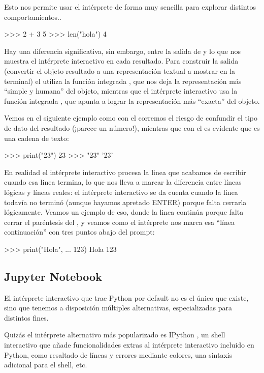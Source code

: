 Esto nos permite usar el intérprete de forma muy sencilla para explorar distintos comportamientos..

\begin{py}
>>> 2 + 3
5
>>> len("hola")
4
\end{py}

Hay una diferencia significativa, sin embargo, entre la salida de  y lo que nos muestra el intérprete interactivo en cada resultado. Para construir la salida (convertir el objeto resultado a una representación textual a mostrar en la terminal) el  utiliza la función integrada , que nos deja la representación más ``simple y humana'' del objeto, mientras que el intérprete interactivo usa la función integrada , que apunta a lograr la representación más ``exacta'' del objeto.

Vemos en el siguiente ejemplo como con el  corremos el riesgo de confundir el tipo de dato del resultado (¡parece un número!), mientras que con el  es evidente que es una cadena de texto:

\begin{py}
>>> print("23")
23
>>> "23"
'23'
\end{py}

En realidad el intérprete interactivo procesa la linea que acabamos de escribir cuando esa linea termina, lo que nos lleva a marcar la diferencia entre líneas lógicas y líneas reales: el intérprete interactivo se da cuenta cuando la linea todavía no terminó (aunque hayamos apretado ENTER) porque falta cerrarla lógicamente. Veamos un ejemplo de eso, donde la linea continúa porque falta cerrar el paréntesis del , y veamos como el intérprete nos marca esa ``línea continuación'' con tres puntos abajo del prompt:

\begin{py}
>>> print("Hola",
... 123)
Hola 123
\end{py}


\subsection{Jupyter Notebook}

El intérprete interactivo que trae Python por default no es el único que existe, sino que tenemos a disposición múltiples alternativas, especializadas para distintos fines.

Quizás el intérprete alternativo más popularizado es IPython \cite{ipython}, un shell interactivo que añade funcionalidades extras al intérprete interactivo incluido en Python, como resaltado de líneas y errores mediante colores, una sintaxis adicional para el shell, etc.

